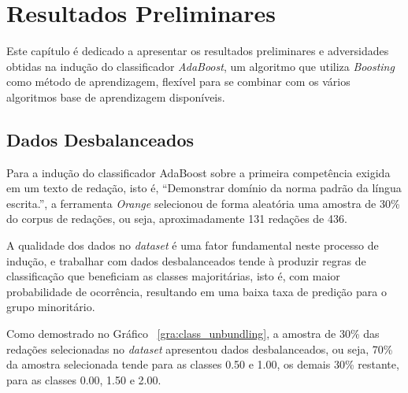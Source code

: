 \chapter{Resultados Preliminares}\label{result}

Este capítulo é dedicado a apresentar os resultados preliminares e adversidades obtidas na indução do classificador \textit{AdaBoost}, um algoritmo que utiliza \textit{Boosting} como método de aprendizagem, flexível para se combinar com os vários algoritmos base de aprendizagem disponíveis.

\section{Dados Desbalanceados}

Para a indução do classificador AdaBoost sobre a primeira competência exigida em um texto de redação, isto é,  ``Demonstrar domínio da norma padrão da língua escrita.'', a ferramenta \textit{Orange} selecionou de forma aleatória uma amostra de 30\% do corpus de redações, ou seja, aproximadamente 131 redações de 436. 

A qualidade dos dados no \textit{dataset} é uma fator fundamental neste processo de indução, e trabalhar com dados desbalanceados tende à produzir regras de classificação que beneficiam as classes majoritárias, isto é, com maior probabilidade de ocorrência, resultando em uma baixa taxa de predição para o grupo minoritário.

Como demostrado no Gráfico ~\ref{gra:class_unbundling}, a amostra de 30\% das redações selecionadas no \textit{dataset} apresentou dados desbalanceados, ou seja, 70\% da amostra selecionada tende para as classes 0.50 e 1.00, os demais 30\% restante, para as classes 0.00, 1.50 e 2.00. 

\mydata

